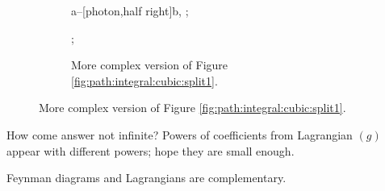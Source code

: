 \documentclass[]{article}
\begin{document}
\begin{figure}[H]
\begin{subfigure}[t]{0.4\textwidth}
\begin{center}
{				a--[photon,half right]b,
			};
		\end{center}
	\end{subfigure}
	\hfill
	\begin{subfigure}[t]{0.4\textwidth}
		\caption{More complex version of Figure \ref{fig:path:integral:cubic:split1}.}\label{fig:path:integral:cubic:split2}
		;
	\end{subfigure}
\end{figure}

How come answer not infinite? Powers of coefficients from Lagrangian $(g)$ appear with different powers; hope they are small enough.

Feynman diagrams and Lagrangians are complementary.

\printglossaries



\end{document}
